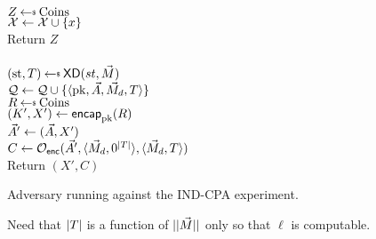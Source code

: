 \begin{figure}[tbhp]
\begin{center}
{\\
  $Z \getsr \mathrm{Coins}$\\
  $\mathcal{X} \gets \mathcal{X} \cup \{x\}$\\
  Return $Z$\\

\\
$(\st, \umd) \getsr \mdalg(st,\vmsg)$\\
$\mathcal{Q} \gets \mathcal{Q} \cup \{\langle \mathrm{pk},\vec{A},\vec{M}_d,T\rangle\}$\\
$R \getsr \mathrm{Coins}$\\
$(K',X') \gets \mathsf{encap}_{\mathrm{pk}}^{}(R)$\\
$\vec{A}' \gets (\vec{A}, X')$\\
$C \gets \mathcal{O}_{\mathsf{enc}}(\vec{A}', \langle \vec{M}_d,0^{|T|}\rangle, \langle \vec{M}_d,T\rangle)$\\
Return $(X',C)$\\
}
\caption{Adversary running against the IND-CPA experiment.}
\label{fig:CPA-KDadv}
\end{center}
\end{figure}

\begin{figure}
\begin{center}
\caption{Need that $|T|$ is a function of $||\vec{M}||$ only so that $\ell$ is computable.}
\end{center}
\end{figure}

